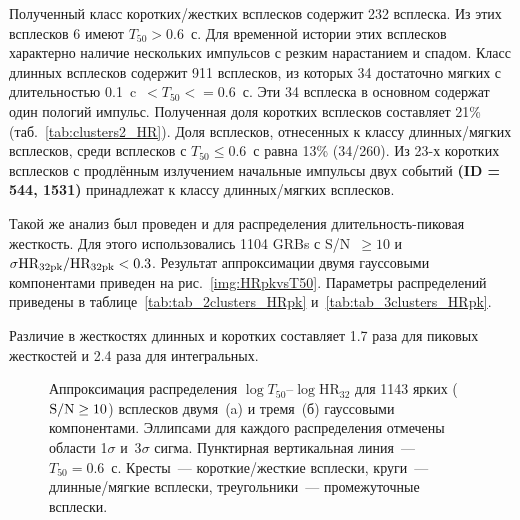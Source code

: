 Полученный класс коротких/жестких всплесков содержит 232 всплеска. Из этих 
всплесков 6 имеют $T_{50} > 0.6$~с. Для временной истории этих всплесков характерно 
наличие нескольких импульсов с резким нарастанием и спадом.  Класс длинных всплесков 
содержит 911 всплесков, из которых 34 достаточно мягких с длительностью 0.1~c~$< T_{50} <=0.6$~с. 
Эти 34 всплеска в основном содержат один пологий импульс. Полученная доля коротких 
всплесков составляет 21\% (таб.~\ref{tab:clusters2_HR}). Доля всплесков, отнесенных 
к классу длинных/мягких всплесков, среди всплесков с $T_{50} \leq 0.6$~с  равна 13\% (34/260). 
Из 23-х коротких всплесков с продлённым излучением начальные импульсы двух 
событий \textbf{(ID = 544, 1531)} принадлежат к классу длинных/мягких всплесков.

Такой же анализ был проведен и для распределения длительность-пиковая жесткость. 
Для этого использовались 1104 GRBs с S/N~$ \geq 10$ и $\sigma \mbox{HR}_{32{\mathrm{pk}}}/\mbox{HR}_{32{\mathrm{pk}}} <0.3$. 
Результат аппроксимации двумя гауссовыми компонентами приведен на рис.~\ref{img:HRpkvsT50}. 
Параметры распределений приведены в таблице~\ref{tab:tab_2clusters_HRpk} и~\ref{tab:tab_3clusters_HRpk}. 

Различие в жесткостях длинных и коротких составляет 1.7 раза для пиковых 
жесткостей и 2.4 раза для интегральных. 



\begin{figure}[h]
  \begin{minipage}[h]{0.5\textwidth}
  \end{minipage}
  \hfill
  \begin{minipage}[h]{0.5\textwidth}
  \end{minipage}
  \caption{Аппроксимация распределения $\log T_{50}$--$\log \mbox{HR}_{32}$ 
  для 1143 ярких (${\mathrm{S/N}}\geq 10$) всплесков двумя~(a) и тремя~(б) гауссовыми компонентами. 
  Эллипсами для каждого распределения отмечены области 1$\sigma$ и~3$\sigma$ сигма. 
  Пунктирная вертикальная линия~--- $T_{50} = 0.6$~с. Кресты~--- короткие/жесткие всплески, 
  круги~--- длинные/мягкие всплески, треугольники~--- промежуточные всплески.}
  \label{img:HRvsT50}  
\end{figure}

